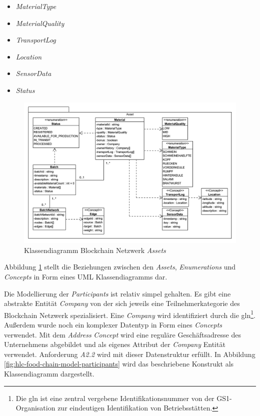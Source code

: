\begin{itemize}
	\item \textit{MaterialType}
	\item \textit{MaterialQuality}
	\item \textit{TransportLog}
	\item \textit{Location}
	\item \textit{SensorData}
	\item \textit{Status}
\end{itemize}

\begin{figure}[H]
	\centering
	\includegraphics[width=1\linewidth]{pictures/hlc-food-chain-model-assets}
	\caption[Klassendiagramm Blockchain Netzwerk \textit{Assets}]{Klassendiagramm Blockchain Netzwerk \textit{Assets}}
	\label{fig:hlc-food-chain-model-assets}
\end{figure}

Abbildung \ref{fig:hlc-food-chain-model-assets} stellt die Beziehungen zwischen den \textit{Assets}, \textit{Enumerations} und \textit{Concepts} in Form eines UML Klassendiagramms dar.

Die Modellierung der \textit{Participants} ist relativ simpel gehalten. Es gibt eine abstrakte Entität \textit{Company} von der sich jeweils eine Teilnehmerkategorie des Blockchain Netzwerk spezialisiert. Eine \textit{Company} wird identifiziert durch die \ac{gln}\footnote{Die \ac{gln} ist eine zentral vergebene Identifikationsnummer von der GS1-Organisation zur eindeutigen Identifikation von Betriebsstätten.}. Außerdem wurde noch ein komplexer Datentyp in Form eines \textit{Concepts} verwendet. Mit dem \textit{Address} \textit{Concept} wird eine reguläre Geschäftsadresse des Unternehmens abgebildet und als eigenes Attribut der \textit{Company} Entität verwendet. Anforderung \textit{A2.2} wird mit dieser Datenstruktur erfüllt. In Abbildung \ref{fig:hlc-food-chain-model-participants} wird das beschriebene Konstrukt als Klassendiagramm dargestellt.

